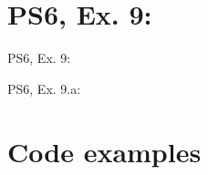 \section{PS6, Ex. 9: }

\begin{frame}{PS6, Ex. 9: }
  \begin{multicols}{2}
    \vfill\null \columnbreak
    \vfill\null
  \end{multicols}
\end{frame}

\begin{frame}{PS6, Ex. 9.a: }
  \begin{multicols}{2}
    \vfill\null \columnbreak
    \vfill\null
  \end{multicols}
\end{frame}



\section{Code examples} %

